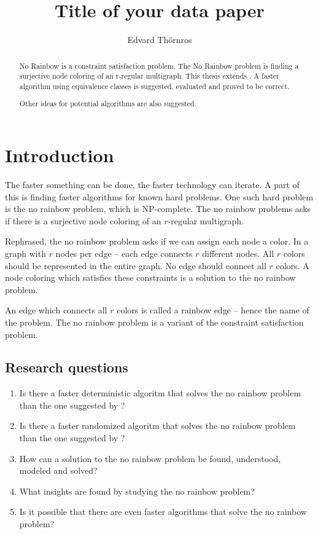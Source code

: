 \documentclass{article}
\title{Title of your data paper}
\author{Edvard Thörnros}
\begin{document}
\maketitle

\begin{abstract}

No Rainbow is a constraint satisfaction problem.
The No Rainbow problem is finding a surjective node coloring of an r-regular multigraph.
This thesis extends \cite{sourceNoRainbow}.
A faster algorithm using equivalence classes is suggested, evaluated and proved to be correct.

Other ideas for potential algorithms are also suggested.

\end{abstract}

\section{Introduction}
The faster something can be done, the faster technology can iterate.
A part of this is finding faster algorithms for known hard problems.
One such hard problem is the no rainbow problem, which is NP-complete\cite{sourceNoRainbow}.
The no rainbow problems asks if there is a surjective node coloring of an $r$-regular multigraph.

Rephrased, the no rainbow problem asks if we can assign each node a color.
In a graph with $r$ nodes per edge -- each edge connects $r$ different nodes.
All $r$ colors should be represented in the entire graph.
No edge should connect all $r$ colors.
A node coloring which satisfies these constraints is a solution to the no rainbow problem.

An edge which connects all $r$ colors is called a rainbow edge -- hence the name of the problem.
The no rainbow problem is a variant of the constraint satisfaction problem.

\subsection{Research questions}
\begin{enumerate}
  \item Is there a faster deterministic algoritm that solves the no rainbow problem than the one suggested by \cite{sourceNoRainbow}?
  \item Is there a faster randomized algoritm that solves the no rainbow problem than the one suggested by \cite{sourceNoRainbow}?
  \item How can a solution to the no rainbow problem be found, understood, modeled and solved?
  \item What insights are found by studying the no rainbow problem?
  \item Is it possible that there are even faster algorithms that solve the no rainbow problem?
\end{enumerate}
\end{document}
